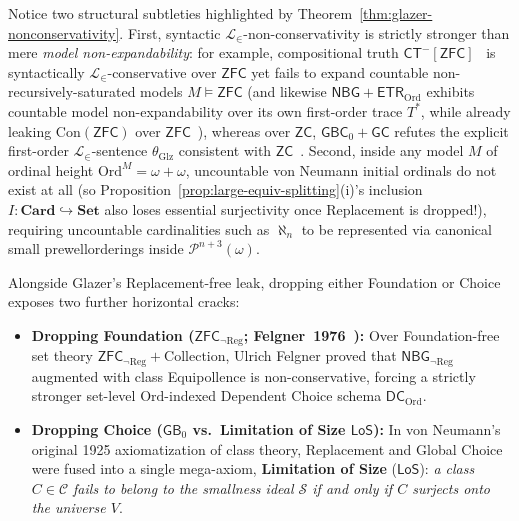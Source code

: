 Notice two structural subtleties highlighted by Theorem~\ref{thm:glazer-nonconservativity}. First, syntactic $\mathcal{L}_\in$-non-conservativity is strictly stronger than mere \emph{model non-expandability}: for example, compositional truth $\mathsf{CT}^-[\mathsf{ZFC}]$~\cite{Fujimoto12} is syntactically $\mathcal{L}_\in$-conservative over $\mathsf{ZFC}$ yet fails to expand countable non-recursively-saturated models $M \models \mathsf{ZFC}$ (and likewise $\mathsf{NBG} + \mathsf{ETR}_{\mathrm{Ord}}$ exhibits countable model non-expandability over its own first-order trace $T^*$, while already leaking $\mathrm{Con}(\mathsf{ZFC})$ over $\mathsf{ZFC}$~\cite[Thm.~1.2]{Gitman20}), whereas over $\mathsf{ZC}$, $\mathsf{GBC}_0 + \mathsf{GC}$ refutes the explicit first-order $\mathcal{L}_\in$-sentence $\theta_{\mathrm{Glz}}$ consistent with $\mathsf{ZC}$~\cite{Glazer23}. Second, inside any model $M$ of ordinal height $\mathrm{Ord}^M = \omega + \omega$, uncountable von Neumann initial ordinals do not exist at all (so Proposition~\ref{prop:large-equiv-splitting}(i)'s inclusion $I : \mathbf{Card} \hookrightarrow \mathbf{Set}$ also loses essential surjectivity once Replacement is dropped!), requiring uncountable cardinalities such as $\aleph_n$ to be represented via canonical small prewellorderings inside $\mathcal{P}^{n+3}(\omega)$.

Alongside Glazer's Replacement-free leak, dropping either Foundation or Choice exposes two further horizontal cracks:
\begin{itemize}
  \item \textbf{Dropping Foundation ($\mathsf{ZFC}_{\neg\mathrm{Reg}}$; Felgner~1976~\cite{Felgner76}):} Over Foundation-free set theory $\mathsf{ZFC}_{\neg\mathrm{Reg}} + \mathrm{Collection}$, Ulrich Felgner proved that $\mathsf{NBG}_{\neg\mathrm{Reg}}$ augmented with class Equipollence is non-conservative, forcing a strictly stronger set-level $\mathrm{Ord}$-indexed Dependent Choice schema $\mathsf{DC}_{\mathrm{Ord}}$.
  \item \textbf{Dropping Choice ($\mathsf{GB}_0$ vs.\ Limitation of Size $\mathsf{LoS}$):} In von Neumann's original 1925 axiomatization of class theory, Replacement and Global Choice were fused into a single mega-axiom, \textbf{Limitation of Size} ($\mathsf{LoS}$): \emph{a class $C \in \mathcal{C}$ fails to belong to the smallness ideal $\mathcal{S}$ if and only if $C$ surjects onto the universe $V$}.
\end{itemize}

